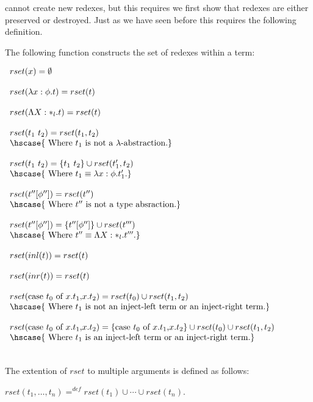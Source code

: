 cannot create new redexes, but this requires we first show that
redexes are either preserved or destroyed. Just as we have seen before
this requires the following definition.
\begin{definition}
  \label{def:rset_ssfp}
  The following function constructs the set of redexes within a term:
  \begin{center}
    \begin{math}
      \begin{array}{lll}    
      rset(x) = \emptyset\\
      & \\
      rset(\lambda x:\phi.t) = rset(t)\\
      & \\
      rset(\Lambda X:*_l.t) = rset(t)\\
      & \\
      rset(t_1\ t_2) = rset(t_1, t_2)\\      
      \hscase{
        \text{ Where } t_1 \text{ is not a } \lambda \text{-abstraction.}
      }\\
      & \\
      rset(t_1\ t_2) = \{t_1\ t_2\} \cup rset(t'_1, t_2)\\
      \hscase{
        \text{ Where } t_1 \equiv \lambda x:\phi.t'_1.
      }\\
      & \\
      rset(t''[\phi'']) = rset(t'')\\
      \hscase{
        \text{ Where } t'' \text{ is not a type absraction.} 
      }\\
      & \\
      rset(t''[\phi'']) = \{t''[\phi'']\} \cup rset(t''') \\
      \hscase{
        \text{ Where } t'' \equiv \Lambda X:*_l.t'''.
      }\\
      & \\
      rset(inl(t)) = rset(t)\\
      & \\
      rset(inr(t)) = rset(t)\\
      & \\
      rset(\ccon{t_0}{x}{t_1}{t_2}) = rset(t_0) \cup rset(t_1,t_2)\\
      \hscase{
        \text{ Where } t_1 \text{ is not an inject-left term or an inject-right term.}
      }\\
      & \\
      rset(\ccon{t_0}{x}{t_1}{t_2}) = \{\ccon{t_0}{x}{t_1}{t_2}\} \cup rset(t_0) \cup rset(t_1,t_2)\\
      \hscase{
        \text{ Where } t_1 \text{ is an inject-left term or an inject-right term.}
      }\\
    \end{array}
    \end{math}
  \end{center}
  \ \\
  The extention of $rset$ to multiple arguments is defined as follows:
  \begin{center}
    $rset(t_1, \ldots, t_n) =^{def} rset(t_1) \cup \cdots \cup rset(t_n)$.
  \end{center}
\end{definition}

